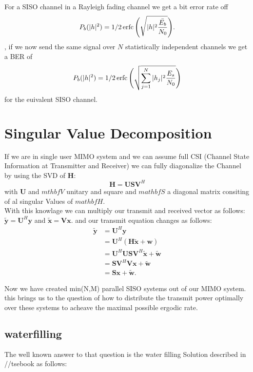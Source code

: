 For a SISO channel in a Rayleigh fading channel we get a bit error rate off
\begin{equation}
	P_b(|h|^2) = 1/2 \operatorname{erfc}{\Biggl(\sqrt{|h|^2\frac{\bar{E_b}}{N_0}}\Biggr)}.
\end{equation}
, if we now send the same signal over $N$ statistically independent channels we get a BER of
\begin{equation}
	P_b(|h|^2) = 1/2 \operatorname{erfc}{\Biggl(\sqrt{\sum_{j=1}^N{|h_j|^2\frac{E_s}{N_0}}}\Biggr)}
\end{equation}
for the euivalent SISO channel.

\section{Singular Value Decomposition}
If we are in single user MIMO system and we can assume full CSI (Channel State Information at Transmitter and Receiver) we can fully diagonalize the Channel by using the SVD of $\mathbf{H}$:
\begin{equation}
	\mathbf{H} = \mathbf{USV}^H
\end{equation}
with $\mathbf{U}$ and $mthbf{V}$ unitary and square and $mathbf{S}$ a diagonal matrix consiting of al singular Values of $mathbf{H}$.\\
With this knowlage we can multiply our transmit and received vector as follows: $\mathbf{\tilde{y}} = \mathbf{U}^H\mathbf{y} $ and $ \mathbf{\tilde{x}} = \mathbf{Vx}$. and our transmit equation changes as follows: 
\begin{align}
	\mathbf{\tilde{y}} &= \mathbf{U}^H\mathbf{y} \\
	& = \mathbf{U}^H(\mathbf{H\tilde{x} + w}) \\
	& = \mathbf{U}^H\mathbf{USV}^H\mathbf{\tilde{x}+\tilde{w}}\\
	& = \mathbf{SV}^H\mathbf{Vx}+\mathbf{\tilde{w}}\\
	&= \mathbf{Sx + \tilde{w}}.
\end{align}

Now we have created min(N,M) parallel SISO systems out of our MIMO system. this brings us to the question of how to distribute the transmit power optimally over these systems to acheave the maximal possible ergodic rate.
\subsection{waterfilling}
The well known answer to that question is the water filling Solution described in //tsebook as follows:


